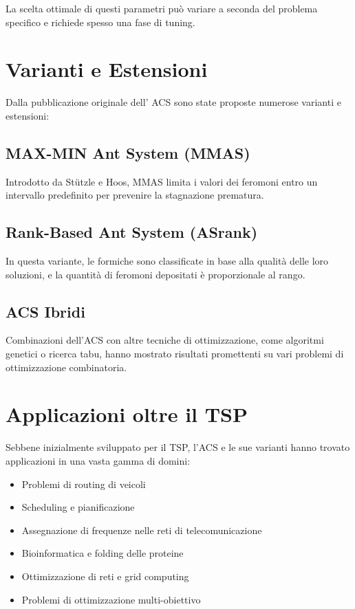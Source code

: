 La scelta ottimale di questi parametri può variare a seconda del problema specifico e richiede spesso una fase di tuning.

\section{Varianti e Estensioni}

Dalla pubblicazione originale dell' \gls{ACS} sono state proposte numerose varianti e estensioni:

\subsection{MAX-MIN Ant System (\gls{MMAS})}
Introdotto da Stützle e Hoos, \gls{MMAS} limita i valori dei feromoni entro un intervallo predefinito per prevenire la stagnazione prematura. \cite{Stuetzle1997}

\subsection{Rank-Based Ant System (\gls{ASrank})}
In questa variante, le formiche sono classificate in base alla qualità delle loro soluzioni, e la quantità di feromoni depositati è proporzionale al rango.

\subsection{\gls{ACS} Ibridi}
Combinazioni dell'\gls{ACS} con altre tecniche di ottimizzazione, come algoritmi genetici o ricerca tabu, hanno mostrato risultati promettenti su vari problemi di ottimizzazione combinatoria. \cite{Dorigo2004}

\section{Applicazioni oltre il \gls{TSP}}

Sebbene inizialmente sviluppato per il \gls{TSP}, l'\gls{ACS} e le sue varianti hanno trovato applicazioni in una vasta gamma di domini:

\begin{itemize}
	\item Problemi di routing di veicoli
	\item Scheduling e pianificazione
	\item Assegnazione di frequenze nelle reti di telecomunicazione
	\item Bioinformatica e folding delle proteine
	\item Ottimizzazione di reti e grid computing
	\item Problemi di ottimizzazione multi-obiettivo
\end{itemize}

